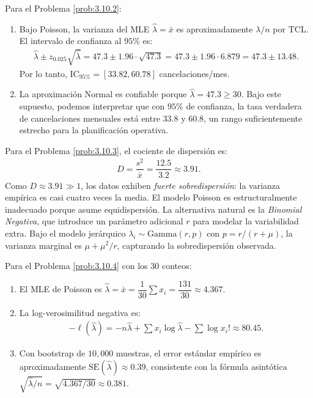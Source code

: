 \begin{solucion}
	\label{sol:3.10.2}
	Para el Problema \ref{prob:3.10.2}:
	\begin{enumerate}
		\item Bajo Poisson, la varianza del MLE $\hat{\lambda} = \bar{x}$ es aproximadamente $\lambda/n$ por TCL. El intervalo de confianza al $95\%$ es:
		\begin{align*}
			\hat{\lambda} \pm z_{0.025}\sqrt{\hat{\lambda}} = 47.3 \pm 1.96 \cdot \sqrt{47.3} = 47.3 \pm 1.96 \cdot 6.879 = 47.3 \pm 13.48.
		\end{align*}
		Por lo tanto, $\text{IC}_{95\%} = [33.82, 60.78]$ cancelaciones/mes.
		\item La aproximación Normal es confiable porque $\hat{\lambda} = 47.3 \ge 30$. Bajo este supuesto, podemos interpretar que con $95\%$ de confianza, la tasa verdadera de cancelaciones mensuales está entre $33.8$ y $60.8$, un rango suficientemente estrecho para la planificación operativa.
	\end{enumerate}
\end{solucion}

\begin{solucion}
	\label{sol:3.10.3}
	Para el Problema \ref{prob:3.10.3}, el cociente de dispersión es:
	\begin{align*}
		D = \dfrac{s^{2}}{\bar{x}} = \dfrac{12.5}{3.2} \approx 3.91.
	\end{align*}
	Como $D \approx 3.91 \gg 1$, los datos exhiben \emph{fuerte sobredispersión}: la varianza empírica es casi cuatro veces la media. El modelo Poisson es estructuralmente inadecuado porque asume equidispersión. La alternativa natural es la \emph{Binomial Negativa}, que introduce un parámetro adicional $r$ para modelar la variabilidad extra. Bajo el modelo jerárquico $\lambda_{i} \sim \text{Gamma}(r, p)$ con $p = r/(r + \mu)$, la varianza marginal es $\mu + \mu^{2}/r$, capturando la sobredispersión observada.
\end{solucion}

\begin{solucion}
	\label{sol:3.10.4}
	Para el Problema \ref{prob:3.10.4} con los $30$ conteos:
	\begin{enumerate}
		\item El MLE de Poisson es $\hat{\lambda} = \bar{x} = \dfrac{1}{30}\sum x_{i} = \dfrac{131}{30} \approx 4.367$.
		\item La log-verosimilitud negativa es:
		\begin{align*}
			-\ell(\hat{\lambda}) = -n\hat{\lambda} + \sum x_{i} \log \hat{\lambda} - \sum \log x_{i}! \approx 80.45.
		\end{align*}
		\item Con bootstrap de $10{,}000$ muestras, el error estándar empírico es aproximadamente $\text{SE}(\hat{\lambda}) \approx 0.39$, consistente con la fórmula asintótica $\sqrt{\hat{\lambda}/n} = \sqrt{4.367/30} \approx 0.381$.
	\end{enumerate}
\end{solucion}

